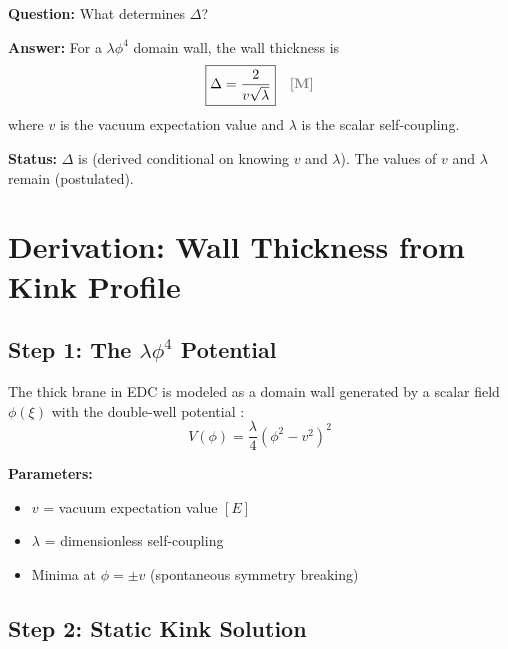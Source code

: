 \begin{tcolorbox}[colback=yellow!5!white, colframe=yellow!50!black,
    title=\textbf{OPR-04 Statement}]
\textbf{Question:} What determines $\Delta$?

\textbf{Answer:} For a $\lambda\phi^4$ domain wall, the wall thickness is
\begin{equation}
    \boxed{\Delta = \frac{2}{v\sqrt{\lambda}}}
    \quad \tagM{}
    \label{eq:ch16:Delta_master}
\end{equation}
where $v$ is the vacuum expectation value and $\lambda$ is the scalar self-coupling.

\textbf{Status:} $\Delta$ is \tagDc{} (derived conditional on knowing $v$ and $\lambda$).
The values of $v$ and $\lambda$ remain \tagP{} (postulated).
\end{tcolorbox}

\section{Derivation: Wall Thickness from Kink Profile}
\label{sec:ch16_derivation}

\subsection{Step 1: The $\lambda\phi^4$ Potential}
\label{subsec:ch16_potential}

The thick brane in EDC is modeled as a domain wall generated by a scalar field
$\phi(\xi)$ with the double-well potential \tagP{}:
\begin{equation}
    V(\phi) = \frac{\lambda}{4} \left(\phi^2 - v^2\right)^2
    \label{eq:ch16:potential}
\end{equation}

\textbf{Parameters:}
\begin{itemize}[nosep]
    \item $v$ = vacuum expectation value $[E]$ \tagP{}
    \item $\lambda$ = dimensionless self-coupling \tagP{}
    \item Minima at $\phi = \pm v$ (spontaneous symmetry breaking)
\end{itemize}

\subsection{Step 2: Static Kink Solution}
\label{subsec:ch16_kink}

